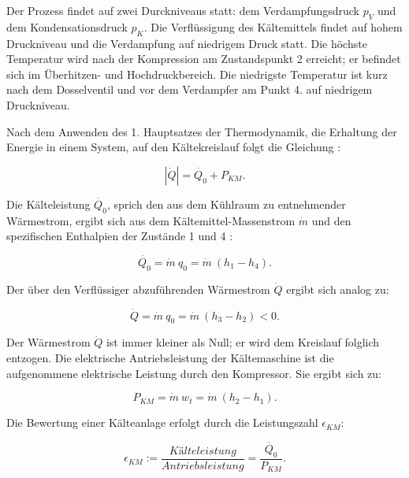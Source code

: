 Der Prozess findet auf zwei Durckniveaus statt: dem Verdampfungsdruck $p_V$ und dem Kondensationsdruck $p_K$. Die Verflüssigung des Kältemittels findet auf hohem Druckniveau und die Verdampfung auf niedrigem Druck statt. Die höchste Temperatur wird nach der Kompression am Zustandspunkt 2 erreicht; er befindet sich im Überhitzen- und Hochdruckbereich. Die niedrigste Temperatur ist kurz nach dem Dosselventil und vor dem Verdampfer am Punkt 4. auf niedrigem Druckniveau. 

Nach dem Anwenden des 1. Hauptsatzes der Thermodynamik, die Erhaltung der Energie in einem System, auf den Kältekreislauf folgt die Gleichung :

 \begin{equation}
 	|\dot{Q}|  = \dot{Q_0} +  P_{KM}.
 	\label{eq:Energiebilanz}
 \end{equation}
 
Die Kälteleistung $\dot{Q_0}$, sprich den aus dem Kühlraum zu entnehmender Wärmestrom, ergibt sich aus dem Kältemittel-Massenstrom $\dot{m}$ und den spezifischen Enthalpien der Zustände 1 und 4 :

\begin{equation}
	\dot{Q_0} = \dot{m}~ q_0 = \dot{m}~ (h_1 - h_4).
	\label{eq:Kälteleistung}
\end{equation}


Der über den Verflüssiger abzuführenden Wärmestrom $\dot{Q}$ ergibt sich analog zu: 

\begin{equation}
	\dot{Q} = \dot{m}~q_0 = \dot{m}~ (h_3 - h_2)< 0.
	\label{eq:Wärmestrom}
\end{equation}

Der Wärmestrom $\dot{Q}$ ist immer kleiner als Null; er wird dem Kreislauf folglich entzogen. Die elektrische Antriebsleistung der Kältemaschine ist die aufgenommene elektrische Leistung durch den Kompressor. Sie ergibt sich zu:

\begin{equation}
P_{KM} = \dot{m}~ w_t= \dot{m}~ (h_2 - h_1).
\label{eq:Antriebsleistung}
\end{equation}

Die Bewertung einer Kälteanlage erfolgt durch die Leistungszahl $\epsilon_{KM}$: 

\begin{equation}
	\epsilon_{KM} := \frac{Kälteleistung}{Antriebsleistung} =\frac{\dot{Q_0}}{P_{KM}}.
	\label{eq:Leistungszahl}
\end{equation}

